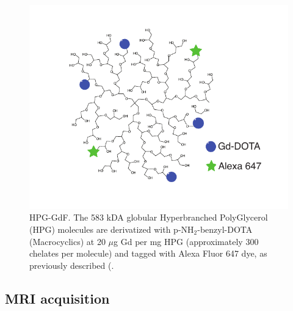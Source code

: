 \begin{figure}[htbp]
 \begin{center}
 \includegraphics[width=\textwidth]{hpg/hpg-paper1-images/hpg_fig1-hpgdf.pdf}
 \caption{\acs{HPG-GdF}. The 583  \acs{kDA} globular Hyperbranched PolyGlycerol (HPG) molecules are derivatized with p-NH$_2$-benzyl-DOTA (Macrocyclics) at 20 $\mu$g Gd per mg HPG (approximately 300 chelates per molecule) and tagged with Alexa Fluor 647 dye, as previously described (\cite{Saatchi:2012hc}.}
 \label{hpgpaper1:fig1}
 \end{center}
\end{figure}
\subsection{MRI acquisition}

